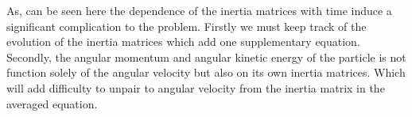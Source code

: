 As, can be seen here the dependence of the inertia matrices with time induce a significant complication to the problem. 
Firstly we must keep track of the evolution of the inertia matrices which add one supplementary equation. 
Secondly, the angular momentum and angular kinetic energy of the particle is not function solely of the angular velocity but also on its own inertia matrices. 
Which will add difficulty to unpair to angular velocity from the inertia matrix in the averaged equation. 



